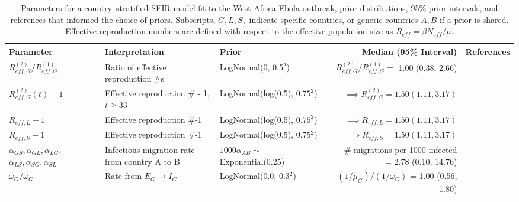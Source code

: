 \begin{table}
	\begin{fullpage}
		\caption[Parameters and priors for a country--stratified SEIR model fit to the West Africa Ebola outbreak.]{Parameters for a country--stratified SEIR model fit to the West Africa Ebola outbreak, prior distributions, 95\% prior intervals, and references that informed the choice of priors. Subscripts, $ G,L,S, $ indicate specific countries, or generic countries $ A,B $ if a prior is shared. Effective reproduction numbers are defined with respect to the effective population size as $ R_{eff} = \beta N_{eff} /\mu $.}
		\label{tab:ebola_priors_single_tight}
		\scriptsize
		\centering
		\begin{tabular}{lllrr}
			\hline
			\textbf{Parameter} &  \textbf{Interpretation} & \textbf{Prior} & \textbf{Median (95\% Interval)} & \textbf{References} \\ \hline
			$ R_{eff,G}^{(2)} / R_{eff,G}^{(1)} $ & Ratio of effective reproduction \#s &  LogNormal(0, 0.5$ ^2 $) & $ R_{eff,G}^{(2)} / R_{eff,G}^{(1)} = $ 1.00 (0.38, 2.66) & \cite{chowell2014transmission,chretien2015mathematical,coltart2017ebola,king2015avoidable} \\
			$ R_{eff,G}^{(2)}(t)-1 $ & Effective reproduction \# - 1, $ t\geq33 $ & LogNormal(log(0.5), $ 0.75^2 $) & $ \implies R_{eff,G}^{(2)} = 1.50 (1.11, 3.17)$ &  \cite{chowell2014transmission,chretien2015mathematical,coltart2017ebola,king2015avoidable} \\
			$ R_{eff,L} -1 $ & Effective reproduction \#-1 &  LogNormal(log(0.5), $ 0.75^2 $) & $ \implies R_{eff,L} = 1.50 (1.11, 3.17)$ &  \cite{chowell2014transmission,chretien2015mathematical,coltart2017ebola,king2015avoidable} \\
			$ R_{eff,S}-1 $ & Effective reproduction \#-1 & LogNormal(log(0.5), 0.75$ ^2 $) & $ \implies R_{eff,S} = 1.50 (1.11, 3.17)$ &  \cite{chowell2014transmission,chretien2015mathematical,coltart2017ebola,king2015avoidable}\\
			\makecell[l]{$ \alpha_{GS},\alpha_{GL}, \alpha_{LG},$\\
				$ \alpha_{LS},\alpha_{SG}, \alpha_{SL} $} & \makecell[l]{Infectious migration rate \\ from country A to B} & $ 1000\alpha_{AB} \sim$ Exponential(0.25) & \makecell[r]{\# migrations per 1000 infected \\ = 2.78 (0.10, 14.76)} & \cite{dudas2017virus}\\ 
			$ \omega_G/\omega_G $ & Rate from $ E_G\rightarrow I_G $ & LogNormal(0.0, 0.3$ ^2 $) & $ (1/\mu_G)\big/(1/\omega_G) $ = 1.00 (0.56, 1.80) & \cite{chowell2014transmission,velasquez2015time,glynn2017variability} \\

\end{tabular}
\end{fullpage}
\end{table}

